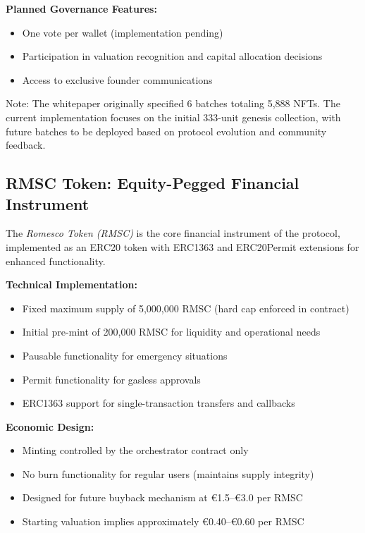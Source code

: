 \documentclass[conference]{IEEEtran}
\begin{document}
\textbf{Planned Governance Features:}
\begin{itemize}
    \item One vote per wallet (implementation pending)
    \item Participation in valuation recognition and capital allocation decisions
    \item Access to exclusive founder communications
\end{itemize}

Note: The whitepaper originally specified 6 batches totaling 5,888 NFTs. The current implementation focuses on the initial 333-unit genesis collection, with future batches to be deployed based on protocol evolution and community feedback.

\subsection{RMSC Token: Equity-Pegged Financial Instrument}

The \textit{Romesco Token (RMSC)} is the core financial instrument of the protocol, implemented as an ERC20 token with ERC1363 and ERC20Permit extensions for enhanced functionality.

\textbf{Technical Implementation:}
\begin{itemize}
    \item Fixed maximum supply of 5,000,000 RMSC (hard cap enforced in contract)
    \item Initial pre-mint of 200,000 RMSC for liquidity and operational needs
    \item Pausable functionality for emergency situations
    \item Permit functionality for gasless approvals
    \item ERC1363 support for single-transaction transfers and callbacks
\end{itemize}

\textbf{Economic Design:}
\begin{itemize}
    \item Minting controlled by the orchestrator contract only
    \item No burn functionality for regular users (maintains supply integrity)
    \item Designed for future buyback mechanism at €1.5–€3.0 per RMSC
    \item Starting valuation implies approximately €0.40–€0.60 per RMSC
\end{itemize}
\end{document}
